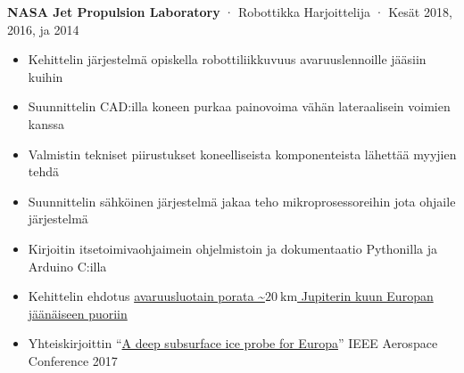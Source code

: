 \documentclass[12pt, oneside]{article}
\newcommand{\jobtitle}[3] {
	{\bf #1} · {#2} · {#3} \vspace{-7pt} \\
}
\begin{document}
\begin{flushleft}
\jobtitle{NASA Jet Propulsion Laboratory}{Robottikka Harjoittelija}{Kesät 2018, 2016, ja 2014}
\begin{itemize}
	\item Kehittelin järjestelmä opiskella robottiliikkuvuus avaruuslennoille jääsiin kuihin \\
	\item Suunnittelin CAD:illa koneen purkaa painovoima vähän lateraalisein voimien kanssa \\
	\item Valmistin tekniset piirustukset koneelliseista komponenteista lähettää myyjien tehdä \\
	\item Suunnittelin sähköinen järjestelmä jakaa teho mikroprosessoreihin jota ohjaile järjestelmä \\
	\item Kirjoitin itsetoimivaohjaimein ohjelmistoin ja dokumentaatio Pythonilla ja Arduino C:illa \\
	\item Kehittelin ehdotus \href{https://portfolium.com/entry/owms-deep-subsurface-access-level-wind}{avaruusluotain porata \textasciitilde$\SI{20}{\kilo\meter}$ Jupiterin kuun Europan jäänäiseen puoriin} \\
	\item Yhteiskirjoittin ``\href{https://www.researchgate.net/publication/317702124_A_deep_subsurface_ice_probe_for_Europa}{A deep subsurface ice probe for Europa}'' IEEE Aerospace Conference 2017 \\
\end{itemize}


\end{flushleft}
\end{document}
